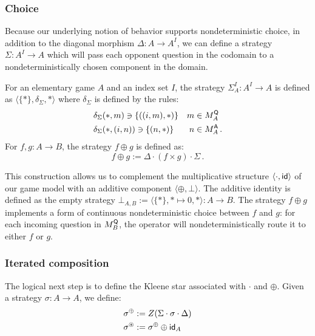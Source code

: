
\subsubsection{Choice} %

Because our underlying notion of behavior supports
nondeterministic choice,
in addition to the diagonal morphism
$\Delta : A \rightarrow A^I$,
we can define a strategy
$\Sigma : A^I \rightarrow A$
which will pass each opponent question in the codomain
to a nondeterministically chosen component in the domain.

\begin{definition}
For an elementary game $A$ and an index set $I$,
the strategy $\Sigma_A^I : A^I \rightarrow A$
is defined as $\langle \{*\}, \delta_\Sigma, * \rangle$
where $\delta_\Sigma$ is defined by the rules:
\begin{align*}
  &\delta_\Sigma(*, m) \ni \{((i, m), *)\} & m &\in M_A^{ \mathsf{Q} } \\
  &\delta_\Sigma(*, (i, n)) \ni \{(n, *)\} & n &\in M_A^{ \mathsf{A} } \,.
\end{align*}
For $f, g : A \rightarrow B$,
the strategy $f \oplus g$ is defined as:
\[ f \oplus g := \Delta \cdot (f \times g) \cdot \Sigma \,. \]
\end{definition}

This construction allows us to complement
the multiplicative structure $\langle \cdot,  \mathsf{id}  \rangle$
of our game model
with an additive component $\langle \oplus, \bot \rangle$.
The additive identity is defined as the empty strategy
$\bot_{A,B} := \langle \{*\}, * \mapsto 0, * \rangle : A \rightarrow B$.
The strategy $f \oplus g$
implements a form of continuous nondeterministic choice between $f$ and $g$:
for each incoming question in $M_B^{ \mathsf{Q} }$,
the operator will nondeterministically route it to either $f$ or $g$.


\subsubsection{Iterated composition}

The logical next step is to define the Kleene star
associated with $\cdot$ and $\oplus$.
Given a strategy $\sigma : A \rightarrow A$,
we define:
\begin{align*}
  \sigma^{\oplus} &:= Z(\Sigma \cdot \sigma \cdot \Delta) \\
  \sigma^{\oast} &:= \sigma^{\oplus} \oplus  \mathsf{id} _A
\end{align*}

